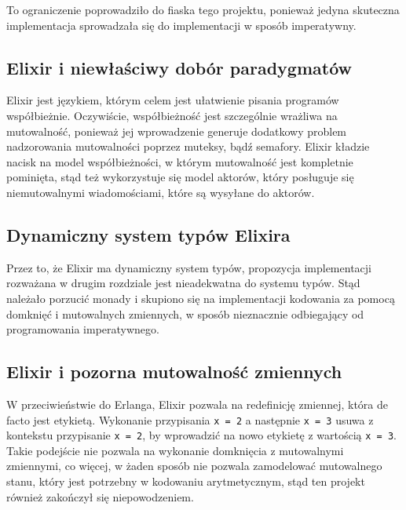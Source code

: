 \documentclass[../praca.tex]{subfiles}
\begin{document}
To ograniczenie poprowadziło do fiaska
tego projektu, ponieważ jedyna skuteczna implementacja 
sprowadzała się do implementacji 
w sposób imperatywny.

\subsection{Elixir i niewłaściwy dobór paradygmatów}

Elixir jest językiem, którym celem jest ułatwienie pisania programów współbieżnie.
Oczywiście, współbieżność jest szczególnie wrażliwa na mutowalność, ponieważ jej
wprowadzenie generuje dodatkowy problem nadzorowania mutowalności poprzez muteksy,
bądź semafory. Elixir kładzie nacisk na model współbieżności, w którym mutowalność
jest kompletnie pominięta, stąd też wykorzystuje się model aktorów, który posługuje
się niemutowalnymi wiadomościami, które są wysyłane do aktorów.

\subsection{Dynamiczny system typów Elixira}

Przez to, że Elixir ma dynamiczny system typów, propozycja implementacji rozważana 
w drugim rozdziale jest nieadekwatna do systemu typów. Stąd należało porzucić
monady i skupiono się na implementacji kodowania za pomocą domknięć i mutowalnych 
zmiennych, w sposób nieznacznie odbiegający od programowania imperatywnego.

\subsection{Elixir i pozorna mutowalność zmiennych}

W przeciwieństwie do Erlanga, Elixir pozwala na redefinicję zmiennej, która de facto
jest etykietą. Wykonanie przypisania \texttt{x = 2} a następnie \texttt{x = 3}
usuwa z kontekstu przypisanie \texttt{x = 2}, by wprowadzić na nowo etykietę 
z wartością \texttt{x = 3}. Takie podejście nie pozwala na wykonanie 
domknięcia z mutowalnymi zmiennymi, co więcej, w żaden sposób nie pozwala
zamodelować mutowalnego stanu, który jest potrzebny w kodowaniu arytmetycznym, stąd
ten projekt również zakończył się niepowodzeniem.
\end{document}
